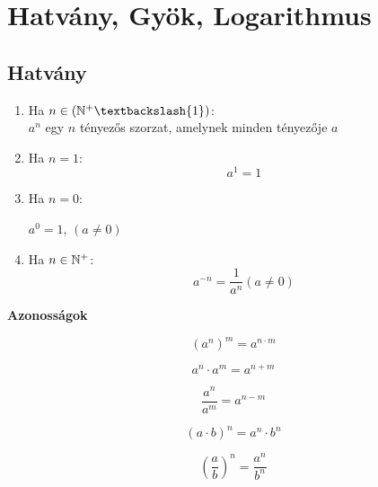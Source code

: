 \setcounter{section}{1}
\section{Hatvány, Gyök, Logarithmus}

\subsection{Hatvány}

 {
	\begin{enumerate}[label=\bfseries\tiny\protect\circled{\small\arabic*}]
		\item Ha $n\in\left(\NN^+ \textbackslash\{1\}\right)$:\\
			$a^n$ egy $n$ tényezős szorzat, amelynek minden tényezője $a$
		\item Ha $n=1$:
			$$a^1=1$$
		\item Ha $n=0$:
			\begin{center}
				$a^0=1$, $\left(a\neq0\right)$
			\end{center}
		\item Ha $n\in\NN^+$:
			$$a^{-n} = \frac{1}{a^n} \left(a\neq 0\right)$$
	\end{enumerate}
}

\begin{tcolorbox}
	\begin{center}
		\bf\huge{Azonosságok}
	\end{center}
	\begin{minipage}{0.49\textwidth}
		\begin{tcolorbox}[width=\textwidth,center]
			$$\left(a^n\right)^m=a^{n\cdot m}$$
		\end{tcolorbox}
		\begin{tcolorbox}[width=\textwidth,center]
			$$a^n\cdot a^m = a^{n+m}$$
		\end{tcolorbox}
	\end{minipage}
	\hfill
	\begin{minipage}{0.49\textwidth}
		\begin{tcolorbox}[width=\textwidth,center]
			$$\frac{a^n}{a^m}=a^{n-m}$$
		\end{tcolorbox}
		\begin{tcolorbox}[width=\textwidth,center]
			$$\left(a\cdot b\right)^n = a^n\cdot b^n$$
		\end{tcolorbox}
	\end{minipage}
	\begin{tcolorbox}[width=0.5\textwidth,center]$$\left(\frac{a}{b}\right)^n = \frac{a^n}{b^n}$$\end{tcolorbox}
\end{tcolorbox}

